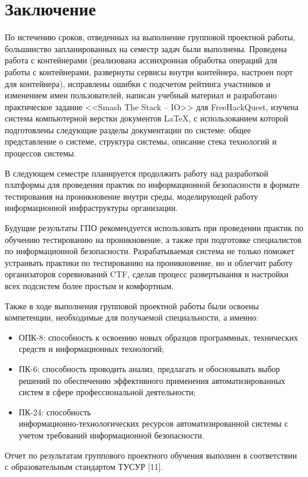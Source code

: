 \section*{Заключение}

По истечению сроков, отведенных на выполнение групповой проектной работы, большинство запланированных на семестр задач были выполнены. Проведена работа с контейнерами (реализована ассинхронная обработка операций для работы с контейнерами, развернуты сервисы внутри контейнера, настроен порт для контейнера), исправлены ошибки с подсчетом рейтинга участников и изменением имен пользователей, написан учебный материал и разработано практическое задание <<Smash The Stack -- IO>> для FreeHackQuest, изучена система компьютерной верстки документов \LaTeX, с использованием которой подготовлены следующие разделы документации по системе: общее представление о системе, структура системы, описание стека технологий и процессов системы.\par 
В следующем семестре планируется продолжить работу над разработкой платформы для проведения практик по информационной безопасности в формате тестирования на проникновение внутри среды, моделирующей работу информационной инфраструктуры организации.\par
Будущие результаты ГПО рекомендуется использовать при проведении практик по обучению тестированию на проникновение, а также при подготовке специалистов по информационной безопасности. Разрабатываемая система не только поможет устраивать практики по тестированию на проникновение, но и облегчит работу организаторов соревнований CTF, сделав процесс развертывания и настройки всех подсистем более простым и комфортным.\par
Также в ходе выполнения групповой проектной работы были освоены компетенции, необходимые для получаемой специальности, а именно:
\begin{itemize}
\item ОПК-8: способность к освоению новых образцов программных, технических средств и информационных технологий;
\item ПК-6: способность проводить анализ, предлагать и обосновывать выбор решений по обеспечению эффективного применения автоматизированных систем в сфере профессиональной деятельности;
\item ПК-24: способность \\информационно-технологических ресурсов автоматизированной системы с учетом требований информационной безопасности.\par
\end{itemize}
\vspace{\baselineskip}

Отчет по результатам группового проектного обучения выполнен в соответствии с образовательным стандартом ТУСУР [11].
\clearpage
